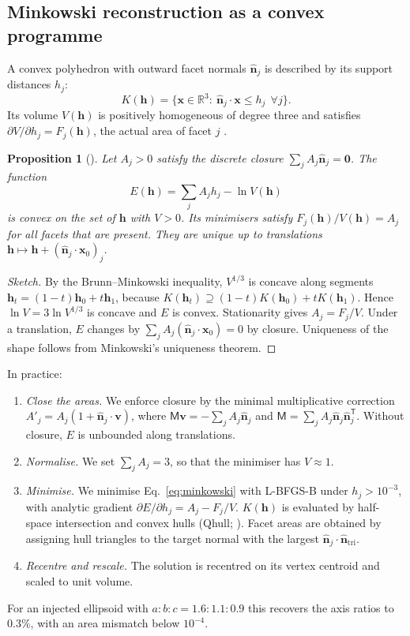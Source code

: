 \documentclass[11pt,a4paper]{article}
\newtheorem{proposition}{Proposition}
\theoremstyle{remark}
\newcommand{\vect}[1]{\bm{#1}}
\newcommand{\uv}[1]{\hat{\bm{#1}}}
\newcommand{\R}{\mathbb{R}}
\newcommand{\T}{^{\mathsf T}}
\begin{document}
\subsection{Minkowski reconstruction as a convex programme}
A convex polyhedron with outward facet normals $\uv n_j$ is described by its support distances
$h_j$:
\begin{equation}
  K(\vect h)=\{\vect x\in\R^3:\ \uv n_j\cdot\vect x\le h_j\ \ \forall j\}.
\end{equation}
Its volume $V(\vect h)$ is positively homogeneous of degree three and satisfies
$\partial V/\partial h_j=F_j(\vect h)$, the actual area of facet $j$ \citep{schneider2014}.

\begin{proposition}[\citealp{little1983,lamberg1993}]
Let $A_j>0$ satisfy the discrete closure $\sum_jA_j\uv n_j=\vect 0$. The function
\begin{equation}
  E(\vect h)=\sum_j A_jh_j-\ln V(\vect h)
  \label{eq:minkowski}
\end{equation}
is convex on the set of $\vect h$ with $V>0$. Its minimisers satisfy $F_j(\vect h)/V(\vect h)=A_j$ for
all facets that are present. They are unique up to translations $\vect h\mapsto\vect h+(\uv n_j\cdot\vect x_0)_j$.
\end{proposition}
\begin{proof}[Sketch]
By the Brunn--Minkowski inequality, $V^{1/3}$ is concave along segments $\vect h_t=(1-t)\vect h_0+t\vect h_1$,
because $K(\vect h_t)\supseteq(1-t)K(\vect h_0)+tK(\vect h_1)$. Hence $\ln V=3\ln V^{1/3}$ is concave and
$E$ is convex. Stationarity gives $A_j=F_j/V$. Under a translation, $E$ changes by
$\sum_jA_j(\uv n_j\cdot\vect x_0)=0$ by closure. Uniqueness of the shape follows from Minkowski's
uniqueness theorem.
\end{proof}

In practice:
\begin{enumerate}[nosep]
\item \emph{Close the areas.} We enforce closure by the minimal multiplicative correction
  $A'_j=A_j(1+\uv n_j\cdot\vect v)$, where $\mathsf M\vect v=-\sum_jA_j\uv n_j$ and
  $\mathsf M=\sum_jA_j\uv n_j\uv n_j\T$. Without closure, $E$ is unbounded along translations.
\item \emph{Normalise.} We set $\sum_jA_j=3$, so that the minimiser has $V\approx1$.
\item \emph{Minimise.} We minimise Eq.~\eqref{eq:minkowski} with L-BFGS-B under $h_j>10^{-3}$, with
  analytic gradient $\partial E/\partial h_j=A_j-F_j/V$. $K(\vect h)$ is evaluated by half-space
  intersection and convex hulls (Qhull; \citealp{barber1996}). Facet areas are obtained by assigning
  hull triangles to the target normal with the largest $\uv n_j\cdot\uv n_{\mathrm{tri}}$.
\item \emph{Recentre and rescale.} The solution is recentred on its vertex centroid and scaled to unit
  volume.
\end{enumerate}
For an injected ellipsoid with $a:b:c=1.6:1.1:0.9$ this recovers the axis ratios to $0.3\%$, with an
area mismatch below $10^{-4}$.
\end{document}
